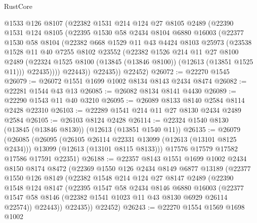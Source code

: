 \begin{lexlean}{RustCore}
\begin{coremodule}
        @1533
        @126
        @8107
        (@22382
          @1531
          @214
          @124
          @27
          @8105
          @2489
          (@22390
            @1531
            @124
            @8105
            (@22395
              @1530
              @58
              @2434
              @8104
              @6880
              @16003
              (@22377
                @1530
                @58
                @8104
                (@22382
                  @668
                  @1529
                  @11
                  @43
                  @4424
                  @8103
                  @25973
                  (@23538
                    @1528
                    @11
                    @40
                    @7255
                    @8102
                    @23552
                    (@22382
                      @1526
                      @214
                      @11
                      @27
                      @8100
                      @2489
                      (@22324 @1525 @8100 (@13845 (@13846 @8100)) (@12613 (@13851 @1525 @11)))
                      @22435))))
              @22443))
          @22435))
      @22452)
@26072 := @22270 @1545
@26079 := @26072 @1551 @1699 @1002 @8134 @8143 @2434 @8474
@26082 := @22281 @1544 @43 @13
@26085 := @26082 @8134 @8141 @4430
@26089 := @22290 @1543 @11 @40 @3210
@26095 := @26089 @8133 @8140 @2584 @8114 @2428 @22310
@26103 := @22289 @1541 @214 @11 @27 @8130 @2434 @2489 @2584
@26105 := @26103 @8124 @2428
@26114 := @22324 @1540 @8130 (@13845 (@13846 @8130)) (@12613 (@13851 @1540 @11))
@26135 := @26079
    (@26085
      (@26095
        (@26105 @26114 @22331 @13099 (@12613 (@13101 @8125 @2434)))
        @13099
        (@12613 (@13101 @8115 @8133)))
      @17576
      @17579
      @17582
      @17586
      @17591
      @22351)
@26188 := @22357
    @8143
    @1551
    @1699
    @1002
    @2434
    @8150
    @8174
    @8472
    (@22369
      @1550
      @126
      @2434
      @8149
      @6877
      @13189
      (@22377
        @1550
        @126
        @8149
        (@22382
          @1548
          @214
          @124
          @27
          @8147
          @2489
          (@22390
            @1548
            @124
            @8147
            (@22395
              @1547
              @58
              @2434
              @8146
              @6880
              @16003
              (@22377 @1547 @58 @8146 (@22382 @1541 @1023 @11 @43 @8130 @6929 @26114 @22574))
              @22443))
          @22435))
      @22452)
@26243 := @22270
    @1554
    @1569
    @1698
    @1002

\end{coremodule}
\end{lexlean}

